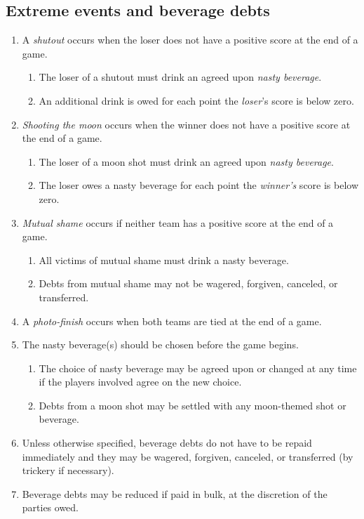 \documentclass[11pt,letterpaper,twocolumn,english,DIV=calc]{scrartcl}
\begin{document}
\subsection{Extreme events and beverage debts}
\begin{enumerate}[leftmargin=2.8em, label=\thesubsection.\arabic*]
	\item A \emph{shutout} occurs when the loser does not have a positive score at the end of a game.

	\begin{enumerate}
		\item The loser of a shutout must drink an agreed upon \emph{nasty beverage}.
		\item An additional drink is owed for each point the \emph{loser}'s score is below zero.
	\end{enumerate}

	\item \emph{Shooting the moon} occurs when the winner does not have a positive score at the end of a game.

	\begin{enumerate}
		\item The loser of a moon shot must drink an agreed upon \emph{nasty beverage}.
		\item The loser owes a nasty beverage for each point the \emph{winner's} score is below zero.
	\end{enumerate}

	\item \emph{Mutual shame} occurs if neither team has a positive score at the end of a game.

	\begin{enumerate}
		\item All victims of mutual shame must drink a nasty beverage.
		\item Debts from mutual shame may not be wagered, forgiven, canceled, or transferred.
	\end{enumerate}

	\item A \emph{photo-finish} occurs when both teams are tied at the end of a game.
	\item The nasty beverage(s) should be chosen before the game begins.

	\begin{enumerate}
		\item The choice of nasty beverage may be agreed upon or changed at any time if the players involved agree on the new choice.
		\item Debts from a moon shot may be settled with any moon-themed shot or beverage.
	\end{enumerate}

	\item Unless otherwise specified, beverage debts do not have to be repaid immediately and they may be wagered, forgiven, canceled, or transferred (by trickery if necessary). 
	\item Beverage debts may be reduced if paid in bulk, at the discretion of the parties owed.
\end{enumerate}
\end{document}
